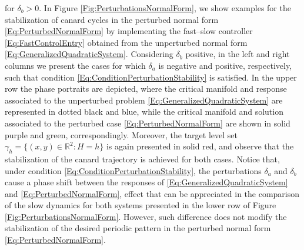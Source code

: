 \documentclass[3p]{elsarticle}
\theoremstyle{plain}
\theoremstyle{remark}
\theoremstyle{definition}
\begin{document}
    for $\delta_{b}>0$. In Figure \ref{Fig:PerturbationsNormalForm}, we show examples for the stabilization of canard cycles in the perturbed normal form \eqref{Eq:PerturbedNormalForm} by implementing the fast--slow controller \eqref{Eq:FastControlEntry} obtained from the unperturbed normal form \eqref{Eq:GeneralizedQuadraticSystem}. Considering $\delta_{b}$ positive, in the left and right columns we present the cases for which $\delta_{a}$ is negative and positive, respectively, such that condition \eqref{Eq:ConditionPerturbationStability} is satisfied. In the upper row the phase portraits are depicted, where the critical manifold and response associated to the unperturbed problem \eqref{Eq:GeneralizedQuadraticSystem} are represented in dotted black and blue, while the critical manifold and solution associated to the perturbed case \eqref{Eq:PerturbedNormalForm} are shown in solid purple and green, correspondingly. Moreover, the target level set $\gamma_{h}=\{ (x,y)\in \mathbb{R}^{2}:H=h \}$ is again presented in solid red, and observe that the stabilization of the canard trajectory is achieved for both cases. Notice that, under condition \eqref{Eq:ConditionPerturbationStability}, the perturbations $\delta_{a}$ and $\delta_{b}$ cause a phase shift between the responses of \eqref{Eq:GeneralizedQuadraticSystem} and \eqref{Eq:PerturbedNormalForm}, effect that can be appreciated in the comparison of the slow dynamics for both systems presented in the lower row of Figure \ref{Fig:PerturbationsNormalForm}. However, such difference does not modify the stabilization of the desired periodic pattern  in the perturbed normal form \eqref{Eq:PerturbedNormalForm}. 
\end{document}
